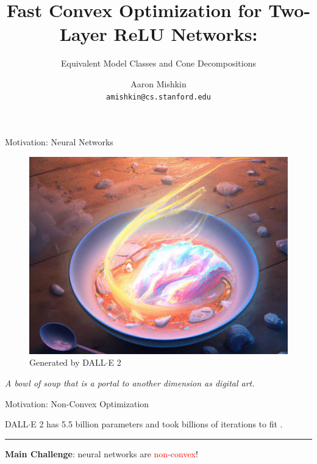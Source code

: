 \documentclass[usenames,dvipsnames,mathserif,notheorems]{beamer}
\title{Fast Convex Optimization for Two-Layer ReLU Networks:}
\subtitle{Equivalent Model Classes and Cone Decompositions}
\author{Aaron Mishkin \\ \texttt{amishkin@cs.stanford.edu}}
\date{}
\begin{document}
\maketitle

\begin{frame}{Motivation: Neural Networks}

	\begin{figure}[]
		\centering
		\includegraphics[width=0.65\linewidth]{assets/bowl_of_soup.jpg}
		\caption*{Generated by DALL$\cdot$E 2}%
	\end{figure}

	\begin{center}
		\textit{\Large A bowl of soup that is a portal to another
			dimension as digital art.}
	\end{center}


\end{frame}

\begin{frame}{Motivation: Non-Convex Optimization}

	\begin{center}
		\Large
		DALL$\cdot$E 2 has 5.5 billion parameters and took billions of iterations to fit \citep{ramesh2022dalle}.

	\end{center}

	\vspace{1em}
	\pause

	{
		\vspace{-0.5em}
		\center \rule{\textwidth}{0.1em}
		\vspace{-0.2em}
	}

	\begin{center}
		\Large

		\textbf{Main Challenge}: neural networks are \textcolor{red}{non-convex}!
	\end{center}


	\vspace{0.2em}
	\begin{figure}[b]
		\centering
		
	\end{figure}

\end{frame}
\end{document}
